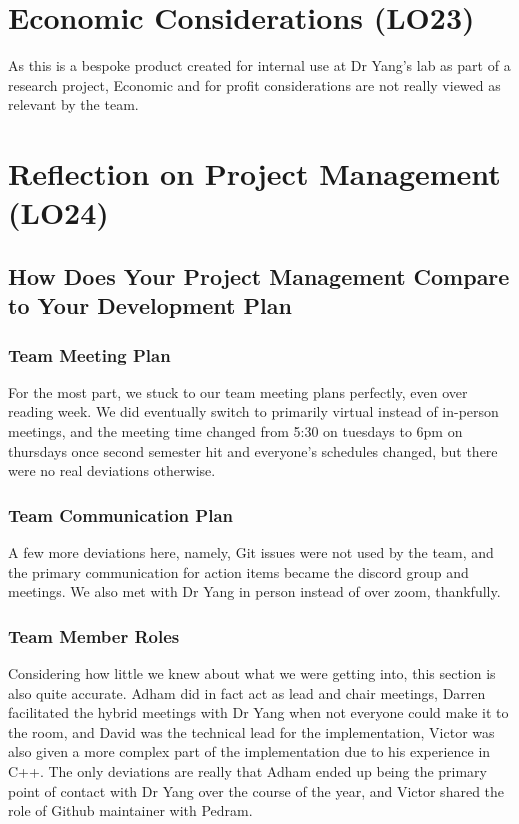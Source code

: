 \documentclass{article}
\begin{document}
\section{Economic Considerations (LO23)}

As this is a bespoke product created for internal use at Dr Yang's lab as part of a research project, Economic and for profit considerations are not really viewed as relevant by
the team.

\section{Reflection on Project Management (LO24)}


\subsection{How Does Your Project Management Compare to Your Development Plan}

\subsubsection{Team Meeting Plan}
For the most part, we stuck to our team meeting plans perfectly, even over reading week. We did eventually switch to primarily virtual instead of in-person meetings, and the
meeting time changed from 5:30 on tuesdays to 6pm on thursdays once second semester hit and everyone's schedules changed, but there were no real deviations otherwise.

\subsubsection{Team Communication Plan}
A few  more deviations here, namely, Git issues were not used by the team, and the primary communication for action items became the discord group and meetings.
We also met with Dr Yang in person instead of over zoom, thankfully.
\subsubsection{Team Member Roles}
Considering how little we knew about what we were getting into, this section is also quite accurate. Adham did in fact act as lead and chair meetings, Darren facilitated the
hybrid meetings with Dr Yang when not everyone could make it to the room, and David was the technical lead for the implementation, Victor was also given a more complex part
of the implementation due to his experience in C++. The only deviations are really that Adham ended up being the primary point of contact with Dr Yang over the course of the
year, and Victor shared the role of Github maintainer with Pedram.
\end{document}
